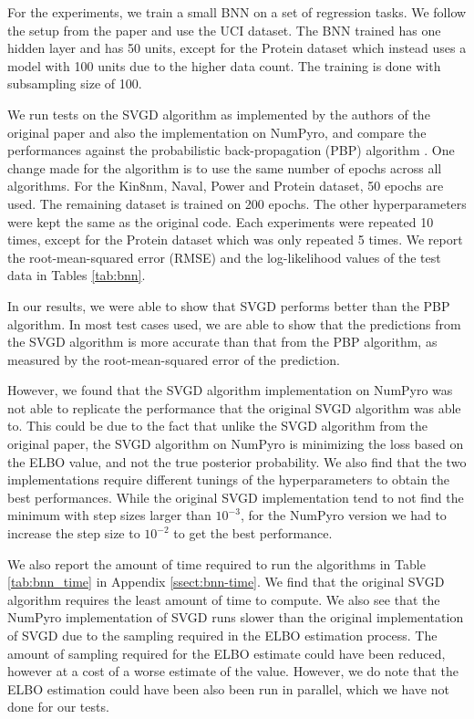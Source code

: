 For the experiments, we train a small BNN on a set of regression tasks. We follow the setup from the paper and use the UCI dataset. The BNN trained has one hidden layer and has 50 units, except for the Protein dataset which instead uses a model with 100 units due to the higher data count. The training is done with subsampling size of 100.

We run tests on the SVGD algorithm as implemented by the authors of the original paper and also the implementation on NumPyro, and compare the performances against the probabilistic back-propagation (PBP) algorithm \cite{pbp}. One change made for the algorithm is to use the same number of epochs across all algorithms. For the Kin8nm, Naval, Power and Protein dataset, 50 epochs are used. The remaining dataset is trained on 200 epochs. The other hyperparameters were kept the same as the original code. Each experiments were repeated 10 times, except for the Protein dataset which was only repeated 5 times. We report the root-mean-squared error (RMSE) and the log-likelihood values of the test data in Tables \ref{tab:bnn}. 



In our results, we were able to show that SVGD performs better than the PBP algorithm. In most test cases used, we are able to show that the predictions from the SVGD algorithm is more accurate than that from the PBP algorithm, as measured by the root-mean-squared error of the prediction. 

However, we found that the SVGD algorithm implementation on NumPyro was not able to replicate the performance that the original SVGD algorithm was able to. This could be due to the fact that unlike the SVGD algorithm from the original paper, the SVGD algorithm on NumPyro is minimizing the loss based on the ELBO value, and not the true posterior probability. We also find that the two implementations require different tunings of the hyperparameters to obtain the best performances. While the original SVGD implementation tend to not find the minimum with step sizes larger than $10^{-3}$, for the NumPyro version we had to increase the step size to $10^{-2}$ to get the best performance. 

We also report the amount of time required to run the algorithms in Table \ref{tab:bnn_time} in Appendix \ref{ssect:bnn-time}. We find that the original SVGD algorithm requires the least amount of time to compute. We also see that the NumPyro implementation of SVGD runs slower than the original implementation of SVGD due to the sampling required in the ELBO estimation process. The amount of sampling required for the ELBO estimate could have been reduced, however at a cost of a worse estimate of the value. However, we do note that the ELBO estimation could have been also been run in parallel, which we have not done for our tests.

